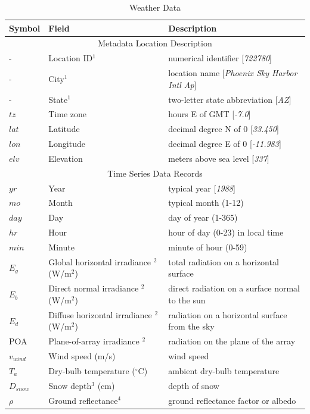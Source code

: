 \documentclass[12pt,letterpaper]{article}
\begin{document}
\begin{table}
\begin{center}
\caption{Weather Data}
\begin{tabular}{lll}
\midrule
Symbol & Field & Description\\
\midrule
\multicolumn{3}{c}{Metadata Location Description}\\
- & Location ID$^1$ & numerical identifier [\textit{722780}]\\
 - & City$^1$ & location name [\textit{Phoenix Sky Harbor Intl Ap}]\\
- & State$^1$ & two-letter state abbreviation [\textit{AZ}]\\
$\mathit{tz}$ &Time zone & hours E of GMT [\textit{-7.0}] \\
$\mathit{lat}$ & Latitude & decimal degree N of 0 [\textit{33.450}] \\
$\mathit{lon}$ & Longitude & decimal degree E of 0 [\textit{-11.983}]\\
$\mathit{elv}$ & Elevation & meters above sea level [\textit{337}]\\
\midrule
\multicolumn{3}{c}{Time Series Data Records}\\
$\mathit{yr}$& Year & typical year [\textit{1988}] \\
$\mathit{mo}$ & Month & typical month (1-12) \\
$\mathit{day}$ & Day & day of year (1-365) \\
$\mathit{hr}$ & Hour & hour of day (0-23) in local time \\
$\mathit{min}$ & Minute & minute of hour (0-59) \\
$E_g$ & Global horizontal irradiance $^2$ (W/m$^2$)& total radiation on a horizontal surface \\
$E_b$ & Direct normal irradiance $^2$ (W/m$^2$) & direct radiation on a surface normal to the sun \\
$E_d$ & Diffuse horizontal irradiance $^2$ (W/m$^2$) & radiation on a horizontal surface from the sky \\
POA & Plane-of-array irradiance $^2$ & radiation on the plane of the array\\
$v_{wind}$ & Wind speed (m/s) & wind speed \\
$T_a$ & Dry-bulb temperature ($^{\circ}$C) & ambient dry-bulb temperature \\
$D_{snow}$ & Snow depth$^3$ (cm) & depth of snow \\
$\mathit{\rho}$ & Ground reflectance$^4$  & ground reflectance factor or albedo \\

\end{tabular}
\end{center}
\end{table}
\end{document}
